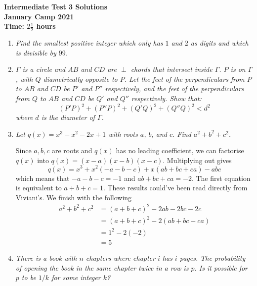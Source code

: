 \documentclass{article}
\begin{document}
\thispagestyle{empty}

\begin{center}
  \textbf{\Large Intermediate Test 3 Solutions}
  \\ \vspace{1em}
  \textbf{\large January Camp 2021}
  \\ \vspace{1em}
  \textbf{\large Time: $2\frac{1}{2}$ hours}
\end{center}

\vspace{24pt}

\begin{enumerate}[1.]

\item %
{\itshape Find the smallest positive integer which only has $1$ and $2$ as digits and which is divisible by $99$.}


\item %
{\itshape ${\Gamma}$ is a circle and ${AB}$ and ${CD}$ are ${\perp}$ chords that intersect inside ${\Gamma}$. ${P}$ is on ${\Gamma}$, with ${Q}$ diametrically opposite to ${P}$. Let the feet of the perpendiculars from ${P}$ to ${AB}$ and ${CD}$ be ${P'}$ and ${P''}$ respectively, and the feet of the perpendiculars from ${Q}$ to ${AB}$ and ${CD}$ be ${Q'}$ and ${Q''}$ respectively. Show that: $${ (P'P)^2+(P''P)^2+(Q'Q)^2+(Q''Q)^2 < d^2}$$ where ${d}$ is the diameter of ${\Gamma}$.}

\item %
{\itshape Let $q(x) = x^3 -x^2 -2x +1$ with roots $a$, $b$, and $c$.
Find $a^2 +b^2 + c^2$.}

Since $a,b,c$ are roots and $q(x)$ has no leading coefficient, we can factorise $q(x)$ into $q(x) = (x - a)(x - b)(x - c)$. Multiplying out gives $$q(x) = x^3 + x^2(-a - b - c) + x(ab + bc + ca) - abc$$ which means that $-a -b -c = -1$ and $ab + bc + ca = -2$. The first equation is equivalent to $a + b + c = 1$. These results could've been read directly from Viviani's. We finish with the following
\begin{align*}
a^2 + b^2 + c^2 &= (a + b + c)^2 - 2ab -2bc -2c\\
&= (a + b + c)^2 - 2(ab + bc + ca)\\
&= 1^2 -2(-2)\\
&= 5
\end{align*}


\item %
{\itshape There is a book with $n$ chapters where chapter $i$ has $i$ pages.
The probability of opening the book in the same chapter twice in a row is $p$.
Is it possible for $p$ to be $1/k$ for some integer $k$?}


\end{enumerate}
\end{document}
